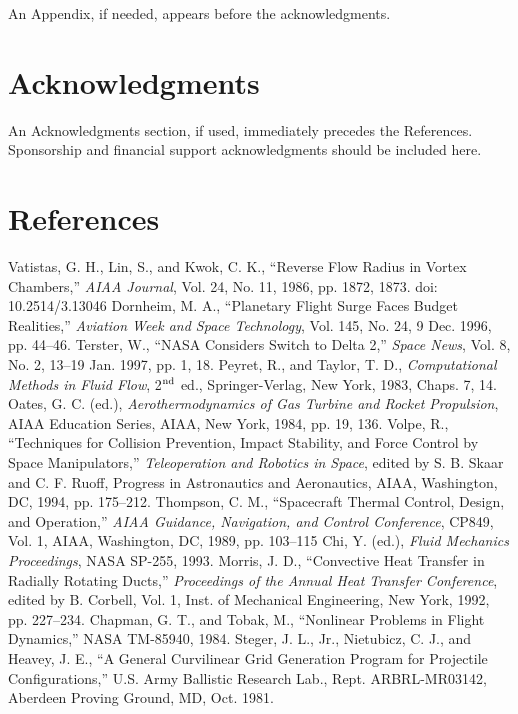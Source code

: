 \documentclass{AIAA}
\begin{document}
An Appendix, if needed, appears before the acknowledgments.

\section*{Acknowledgments}
An Acknowledgments section, if used, immediately precedes the References. Sponsorship and financial support acknowledgments should be included here.

\section*{References}
\begin{thebibliography}{}
 Vatistas, G. H., Lin, S., and Kwok, C. K., ``Reverse Flow Radius in Vortex Chambers,'' \textit{AIAA Journal}, Vol. 24, No. 11, 1986, pp. 1872, 1873. doi: 10.2514/3.13046
 Dornheim, M. A., ``Planetary Flight Surge Faces Budget Realities,'' \textit{Aviation Week and Space Technology}, Vol. 145, No. 24, 9 Dec. 1996, pp. 44--46.
 Terster, W., ``NASA Considers Switch to Delta 2,'' \textit{Space News}, Vol. 8, No. 2, 13--19 Jan. 1997, pp. 1, 18.
 Peyret, R., and Taylor, T. D., \textit{Computational Methods in Fluid Flow}, 2$^{{\rm nd}}$ ed., Springer-Verlag, New York, 1983, Chaps. 7, 14.
 Oates, G. C. (ed.), \textit{Aerothermodynamics of Gas Turbine and Rocket Propulsion}, AIAA Education Series, AIAA, New York, 1984, pp. 19, 136.
 Volpe, R., ``Techniques for Collision Prevention, Impact Stability, and Force Control by Space Manipulators,'' \textit{Teleoperation and Robotics in Space}, edited by S. B. Skaar and C. F. Ruoff, Progress in Astronautics and Aeronautics, AIAA, Washington, DC, 1994, pp. 175--212.
 Thompson, C. M., ``Spacecraft Thermal Control, Design, and Operation,'' \textit{AIAA Guidance, Navigation, and Control Conference}, CP849, Vol. 1, AIAA, Washington, DC, 1989, pp. 103--115
 Chi, Y. (ed.), \textit{Fluid Mechanics Proceedings}, NASA SP-255, 1993.
 Morris, J. D., ``Convective Heat Transfer in Radially Rotating Ducts,'' \textit{Proceedings of the Annual Heat Transfer Conference}, edited by B. Corbell, Vol. 1, Inst. of Mechanical Engineering, New York, 1992, pp. 227--234.
 Chapman, G. T., and Tobak, M., ``Nonlinear Problems in Flight Dynamics,'' NASA TM-85940, 1984.
 Steger, J. L., Jr., Nietubicz, C. J., and Heavey, J. E., ``A General Curvilinear Grid Generation Program for Projectile Configurations,'' U.S. Army Ballistic Research Lab., Rept. ARBRL-MR03142, Aberdeen Proving Ground, MD, Oct. 1981.

\end{thebibliography}
\end{document}
